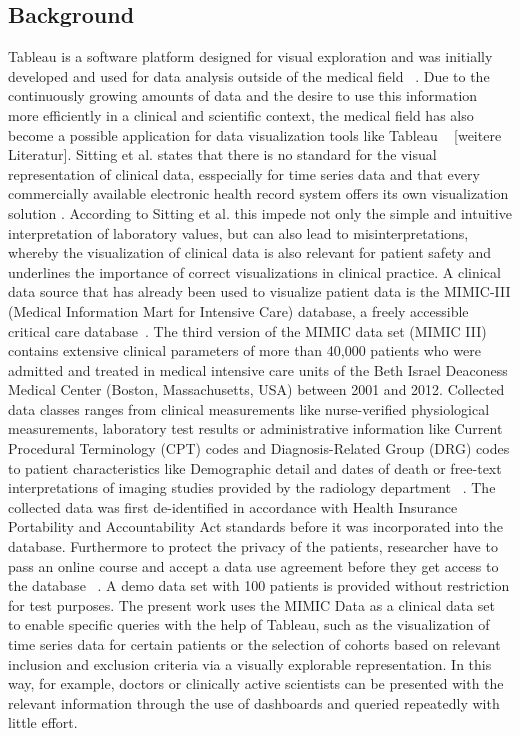 \documentclass[aac,crcready]{iosart2x}
\begin{document}
\subsection{Background}\label{s1.1}
%
Tableau is a software platform designed for visual exploration and was initially developed and used for data analysis outside of the medical field ~\cite{Tableau.2021}. Due to the continuously growing amounts of data and the desire to use this information more efficiently in a clinical and scientific context, the medical field has also become a possible application for data visualization tools like Tableau ~\cite{Ko.2017} [weitere Literatur]. 
Sitting et al. states that there is no standard for the visual representation of clinical data, esspecially for time series data and that every commercially available electronic health record system offers its own visualization solution \cite{Sittig.2015}. According to Sitting et al. this impede not only the simple and intuitive interpretation of laboratory values, but can also lead to misinterpretations, whereby the visualization of clinical data is also relevant for patient safety and underlines the importance of correct visualizations in clinical practice.
A clinical data source that has already been used to visualize patient data is the MIMIC-III (Medical Information Mart for Intensive Care) database, a freely accessible critical care database~\cite{Festag.2019,Lee.2016,Johnson.2020,Johnson.2016}. The third version of the MIMIC data set (MIMIC III) contains extensive clinical parameters of more than 40,000 patients who were admitted and treated in medical intensive care units of the Beth Israel Deaconess Medical Center (Boston, Massachusetts, USA) between 2001 and 2012. Collected data classes ranges from clinical measurements like nurse-verified physiological measurements, laboratory test results or administrative information like Current Procedural Terminology (CPT) codes and Diagnosis-Related Group (DRG) codes to patient characteristics like Demographic detail and dates of death or free-text interpretations of imaging studies provided by the radiology department ~\cite{Johnson.2020,Johnson.2016}. The collected data was first de-identified in accordance with Health Insurance Portability and Accountability Act standards before it was incorporated into the database. Furthermore to protect the privacy of the patients, researcher have to pass an online course and accept a data use agreement before they get access to the database ~\cite{Johnson.2020,Johnson.2016}. A demo data set with 100 patients is provided without restriction for test purposes. 
The present work uses the MIMIC Data as a clinical data set to enable specific queries with the help of Tableau, such as the visualization of time series data for certain patients or the selection of cohorts based on relevant inclusion and exclusion criteria via a visually explorable representation. In this way, for example, doctors or clinically active scientists can be presented with the relevant information through the use of dashboards and queried repeatedly with little effort.
\end{document}
